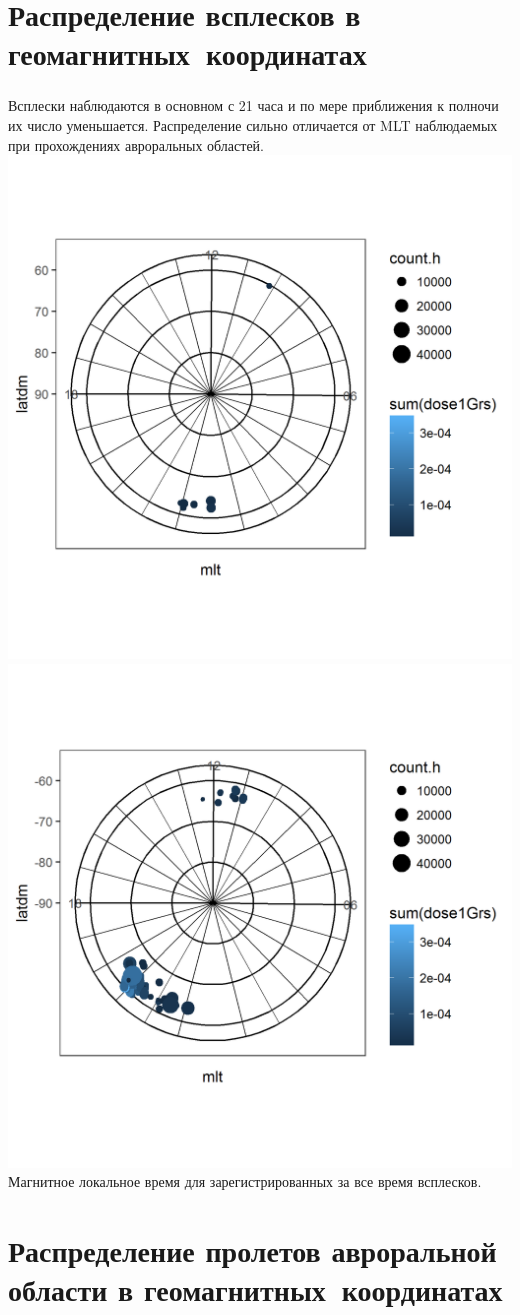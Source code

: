\documentclass[t, aspectratio=43]{beamer}
\begin{document}
\section{Распределение всплесков в геомагнитных~координатах}

\begin{frame}	
\frametitle{\insertsection} 
{\tiny Всплески наблюдаются в основном с 21 часа и по мере приближения к полночи их число уменьшается. 	Распределение сильно отличается от MLT наблюдаемых при прохождениях авроральных областей.}
	\includegraphics[width=0.38\linewidth,trim={0 0 3.2cm 0}, clip]{images/flashmltn}
	\includegraphics[width=0.51\linewidth]{images/flashmlts}\\	
	\tiny{Магнитное локальное время для зарегистрированных за все время всплесков.}

\end{frame}
\section{Распределение пролетов авроральной области в геомагнитных~координатах}
\end{document}
